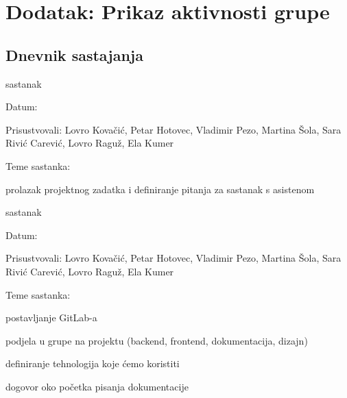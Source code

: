 \chapter*{Dodatak: Prikaz aktivnosti grupe}
		
		\section*{Dnevnik sastajanja}
		
		\begin{packed_enum}
			\item  sastanak
			
			\item[] \begin{packed_item}
				\item Datum: 
				\item Prisustvovali: Lovro Kovačić, Petar Hotovec, Vladimir Pezo, Martina Šola, Sara Rivić Carević, Lovro Raguž, Ela Kumer
				\item Teme sastanka:
				\begin{packed_item}
					\item  prolazak projektnog zadatka i definiranje pitanja za sastanak s asistenom
				\end{packed_item}
			\end{packed_item}
			
			\item  sastanak
			\item[] \begin{packed_item}
				\item Datum: \DTMdisplaydate{2022}{10}{27}{-1}
				\item Prisustvovali: Lovro Kovačić, Petar Hotovec, Vladimir Pezo, Martina Šola, Sara Rivić Carević, Lovro Raguž, Ela Kumer
				\item Teme sastanka:
				\begin{packed_item}
					\item  postavljanje GitLab-a
					\item  podjela u grupe na projektu (backend, frontend, dokumentacija, dizajn)
					\item  definiranje tehnologija koje ćemo koristiti
					\item  dogovor oko početka pisanja dokumentacije
				\end{packed_item}
			\end{packed_item}
			

\end{packed_enum}
